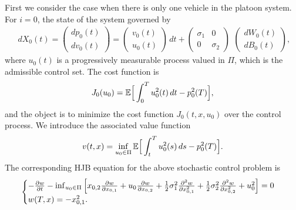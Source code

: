 \documentclass{article}
\begin{document}
First we consider the case when there is only one vehicle in the platoon system. For $i = 0$, the state of the system governed by
\begin{equation} \label{node danamic, N = 0}
\begin{array}{c}
d  X_{0}(t) =
  \left(   \begin{array}{c}
    d  p_{0}(t) \\
    d  v_{0}(t)
  \end{array}   \right)  = 
\left(    \begin{array}{c}
    v_{0}(t) \\
    u_{0}(t)
  \end{array}   \right) \, d t + 
\left(   \begin{array}{cc}
    \sigma_{1} &  0 \\
    0 & \sigma_{2}
  \end{array}   \right)
\end{array}
\left(    \begin{array}{c}
   d W_{0}(t) \\
   d B_{0}(t)
  \end{array}   \right),
\end{equation}
where $u_{0}(t)$ is a progressively measurable process valued in $\Pi$, which is the admissible control set. The cost function is
\begin{equation}
    J_{0} (u_{0}) = \mathbb{E} \Big{[} \int_{0}^{T} u_{0}^{2}(t) \, d t - p_{0}^{2}(T) \Big{]},
\end{equation}
and the object is to minimize the cost function $J_{0} (t, x, u_{0})$ over the control process. We introduce the associated value function
\begin{equation*}
    v(t, x) = \inf_{u_{0} \in \Pi} \mathbb{E} \Big{[} \int_{t}^{T} u_{0}^{2}(s) \, d s - p_{0}^{2}(T) \Big{]}.
\end{equation*}
The corresponding HJB equation for the above stochastic control problem is 
\begin{equation} \label{HJB, N=0}
    \begin{cases}
   - \frac{\partial w}{\partial t} - \inf_{u_{0} \in \Pi} \Big{[} x_{0,2} \frac{\partial w}{\partial x_{0, 1}} + u_{0} \frac{\partial w}{\partial x_{0, 2}} + \frac{1}{2} \sigma_{1}^{2} \frac{\partial^{2} w}{\partial x_{0, 1}^{2}} + \frac{1}{2} \sigma_{2}^{2} \frac{\partial^{2} w}{\partial x_{0, 2}^{2}} + u_{0}^{2} \Big{]}   = 0  \\
   w(T, x) = - x_{0, 1}^{2}.
   \end{cases}
\end{equation}
\end{document}
